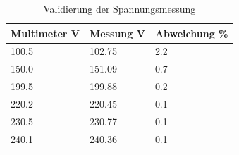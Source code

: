 \begin{table}[!htbp]
\centering
\begin{tabular}{lll}
\textbf{Multimeter V} & \textbf{Messung V} & \textbf{Abweichung \%}\\ \hline
100.5        & 102.75    & 2.2       \\
150.0        & 151.09    & 0.7       \\
199.5        & 199.88    & 0.2       \\
220.2        & 220.45    & 0.1       \\
230.5        & 230.77    & 0.1       \\
240.1        & 240.36    & 0.1       \\
           
\end{tabular}
\caption{Validierung der Spannungsmessung}
\label{tab:SpannungsmessungTabelle}
\end{table}